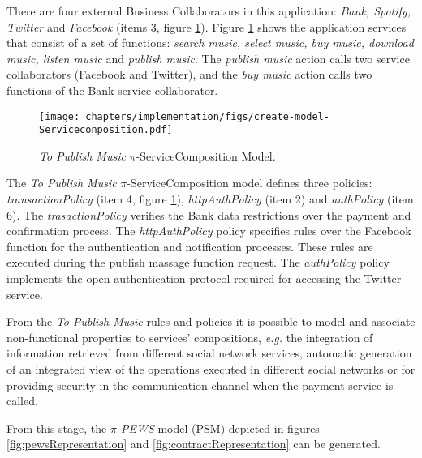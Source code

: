  There are four external {\sc Business
Collaborators} in this application: \textit{Bank, Spotify, Twitter} and
\textit{Facebook} (items 3, figure
\ref{fig:topublishMusic_piserviceCompositionToolModel}). Figure \ref{fig:topublishMusic_piserviceCompositionToolModel} shows the application
services that consist of a set of functions: \textit{search music, select
music, buy music, download music, listen music} and \textit{publish music}. The
\textit{publish music} action calls two service collaborators (Facebook and
Twitter), and the \textit{buy music} action calls two functions of the Bank
service collaborator.
 
\begin{figure}[ht!]
\centering
\texttt{[image: chapters/implementation/figs/create-model-Serviceconposition.pdf]}
\caption{\textit{To Publish Music} $\pi$-ServiceComposition Model.}
\label{fig:topublishMusic_piserviceCompositionToolModel}
\end{figure}


The \textit{To Publish Music} $\pi$-ServiceComposition model defines three
policies: \textit{transactionPolicy} (item 4, figure
\ref{fig:topublishMusic_piserviceCompositionToolModel}), \textit{httpAuthPolicy}
(item 2) and \textit{authPolicy} (item 6). The \textit{trasactionPolicy}
verifies the Bank data restrictions over the payment and confirmation process.
The \textit{httpAuthPolicy} policy specifies rules over the
Facebook function for the authentication and notification processes. These rules
are executed during the publish massage function request. The
\textit{authPolicy} policy implements the open authentication protocol
required for accessing the Twitter service.


From the \textit{To Publish Music} rules and policies it is possible to model
and associate non-functional properties to services' compositions,
\textit{e.g.} the integration of information retrieved from different
social network services, automatic generation of an integrated view of the
operations executed in different social networks or for providing security in
the communication channel when the payment service is called.

From this stage, the \textit{$\pi$-PEWS} model (PSM) depicted in figures
\ref{fig:pewsRepresentation} and \ref{fig:contractRepresentation} can be
generated.


